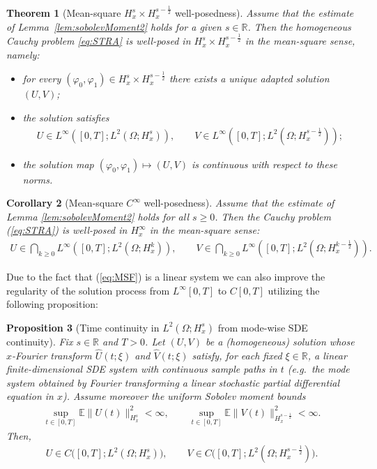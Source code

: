 \documentclass{article}
\def\R{\mathbb{R}}
\def\E{\mathbb{E}}
\newtheorem{theorem}{Theorem}[section]
\newtheorem{proposition}[theorem]{Proposition}
\newtheorem{corollary}[theorem]{Corollary}
\begin{document}
\begin{theorem}[Mean-square $H_x^s\times H_x^{s-\frac12}$ well-posedness]
\label{thm:meansquare}
Assume that the estimate of Lemma~\ref{lem:sobolevMoment2} holds for a given $s\in\R$.
Then the homogeneous Cauchy problem \eqref{eq:STRA} is well-posed in
$H_x^s\times H_x^{s-\frac12}$ in the \emph{mean-square sense}, namely:
\begin{itemize}
\item for every $(\varphi_0,\varphi_1)\in H_x^s\times H_x^{s-\frac12}$ there exists a unique
adapted solution $(U,V)$;
\item the solution satisfies
\begin{align*}
U\in L^\infty([0,T];L^2(\Omega;H_x^s)),\qquad
V\in L^\infty([0,T];L^2(\Omega;H_x^{s-\frac12}));
\end{align*}
\item the solution map $(\varphi_0,\varphi_1)\mapsto (U,V)$ is continuous with respect to
these norms.
\end{itemize}
\end{theorem}

\begin{corollary}[Mean-square $C^\infty$ well-posedness]
Assume that the estimate of Lemma \ref{lem:sobolevMoment2} holds for all $s\ge0$.
Then the Cauchy problem (\ref{eq:STRA}) is well-posed in $H_x^\infty$ in the mean-square
sense:
\begin{align*}
U\in \bigcap_{k\ge0} L^\infty([0,T];L^2(\Omega;H_x^k)),
\qquad
V\in \bigcap_{k\ge0} L^\infty([0,T];L^2(\Omega;H_x^{k-\frac12})).
\end{align*}
\end{corollary}

Due to the fact that (\ref{eq:MSF}) is a linear system we can also
improve the regularity of the solution process from $ L^{\infty}[0,T]  $ to
$ C[0,T] $ utilizing the following proposition:

\begin{proposition}[Time continuity in $L^2(\Omega;H_x^s)$ from mode-wise SDE continuity]\label{lem:timeCont}
Fix $s\in\R$ and $T>0$. Let $(U,V)$ be a (homogeneous) solution whose $x$-Fourier
transform $\widehat U(t;\xi)$ and $\widehat{V}(t;\xi)$ satisfy,
for each fixed $\xi\in\R$, a linear finite-dimensional SDE system with continuous
sample paths in $t$ (e.g.\ the mode system obtained by Fourier transforming a
linear stochastic partial differential equation in $x$). Assume moreover the uniform Sobolev moment bounds
\begin{align}\label{eq:uniformSob}
\sup_{t\in[0,T]}\E\|U(t)\|_{H_x^s}^2<\infty,
\qquad
\sup_{t\in[0,T]}\E\|V(t)\|_{H_x^{s-\frac12}}^2<\infty.
\end{align}
Then,
\begin{align*}
U\in C\big([0,T];L^2(\Omega;H_x^s)\big),
\qquad
V\in C\big([0,T];L^2(\Omega;H_x^{s-\frac12})\big).
\end{align*}
\end{proposition}
\end{document}
